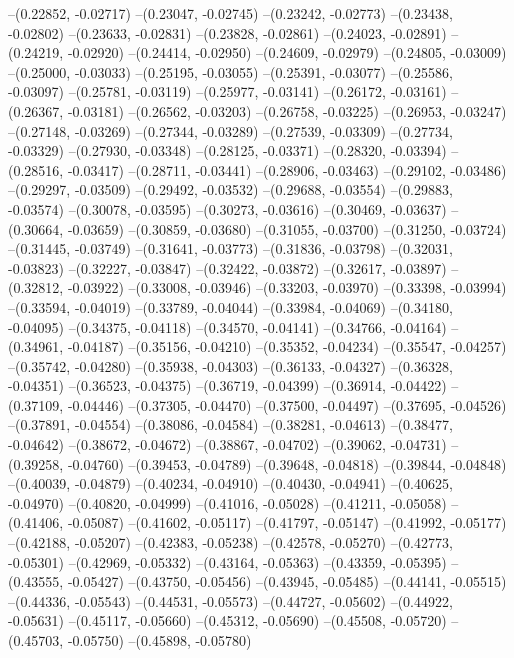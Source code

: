 --(0.22852, -0.02717)
--(0.23047, -0.02745)
--(0.23242, -0.02773)
--(0.23438, -0.02802)
--(0.23633, -0.02831)
--(0.23828, -0.02861)
--(0.24023, -0.02891)
--(0.24219, -0.02920)
--(0.24414, -0.02950)
--(0.24609, -0.02979)
--(0.24805, -0.03009)
--(0.25000, -0.03033)
--(0.25195, -0.03055)
--(0.25391, -0.03077)
--(0.25586, -0.03097)
--(0.25781, -0.03119)
--(0.25977, -0.03141)
--(0.26172, -0.03161)
--(0.26367, -0.03181)
--(0.26562, -0.03203)
--(0.26758, -0.03225)
--(0.26953, -0.03247)
--(0.27148, -0.03269)
--(0.27344, -0.03289)
--(0.27539, -0.03309)
--(0.27734, -0.03329)
--(0.27930, -0.03348)
--(0.28125, -0.03371)
--(0.28320, -0.03394)
--(0.28516, -0.03417)
--(0.28711, -0.03441)
--(0.28906, -0.03463)
--(0.29102, -0.03486)
--(0.29297, -0.03509)
--(0.29492, -0.03532)
--(0.29688, -0.03554)
--(0.29883, -0.03574)
--(0.30078, -0.03595)
--(0.30273, -0.03616)
--(0.30469, -0.03637)
--(0.30664, -0.03659)
--(0.30859, -0.03680)
--(0.31055, -0.03700)
--(0.31250, -0.03724)
--(0.31445, -0.03749)
--(0.31641, -0.03773)
--(0.31836, -0.03798)
--(0.32031, -0.03823)
--(0.32227, -0.03847)
--(0.32422, -0.03872)
--(0.32617, -0.03897)
--(0.32812, -0.03922)
--(0.33008, -0.03946)
--(0.33203, -0.03970)
--(0.33398, -0.03994)
--(0.33594, -0.04019)
--(0.33789, -0.04044)
--(0.33984, -0.04069)
--(0.34180, -0.04095)
--(0.34375, -0.04118)
--(0.34570, -0.04141)
--(0.34766, -0.04164)
--(0.34961, -0.04187)
--(0.35156, -0.04210)
--(0.35352, -0.04234)
--(0.35547, -0.04257)
--(0.35742, -0.04280)
--(0.35938, -0.04303)
--(0.36133, -0.04327)
--(0.36328, -0.04351)
--(0.36523, -0.04375)
--(0.36719, -0.04399)
--(0.36914, -0.04422)
--(0.37109, -0.04446)
--(0.37305, -0.04470)
--(0.37500, -0.04497)
--(0.37695, -0.04526)
--(0.37891, -0.04554)
--(0.38086, -0.04584)
--(0.38281, -0.04613)
--(0.38477, -0.04642)
--(0.38672, -0.04672)
--(0.38867, -0.04702)
--(0.39062, -0.04731)
--(0.39258, -0.04760)
--(0.39453, -0.04789)
--(0.39648, -0.04818)
--(0.39844, -0.04848)
--(0.40039, -0.04879)
--(0.40234, -0.04910)
--(0.40430, -0.04941)
--(0.40625, -0.04970)
--(0.40820, -0.04999)
--(0.41016, -0.05028)
--(0.41211, -0.05058)
--(0.41406, -0.05087)
--(0.41602, -0.05117)
--(0.41797, -0.05147)
--(0.41992, -0.05177)
--(0.42188, -0.05207)
--(0.42383, -0.05238)
--(0.42578, -0.05270)
--(0.42773, -0.05301)
--(0.42969, -0.05332)
--(0.43164, -0.05363)
--(0.43359, -0.05395)
--(0.43555, -0.05427)
--(0.43750, -0.05456)
--(0.43945, -0.05485)
--(0.44141, -0.05515)
--(0.44336, -0.05543)
--(0.44531, -0.05573)
--(0.44727, -0.05602)
--(0.44922, -0.05631)
--(0.45117, -0.05660)
--(0.45312, -0.05690)
--(0.45508, -0.05720)
--(0.45703, -0.05750)
--(0.45898, -0.05780)
